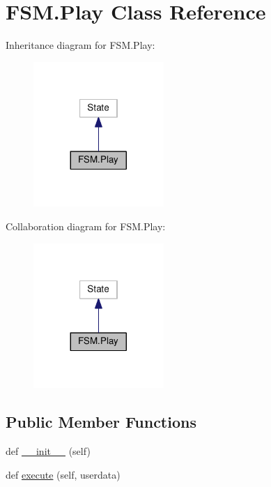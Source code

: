 \hypertarget{classFSM_1_1Play}{}\section{F\+S\+M.\+Play Class Reference}
\label{classFSM_1_1Play}


Inheritance diagram for F\+S\+M.\+Play\+:\nopagebreak
\begin{figure}[H]
\begin{center}
\leavevmode
\includegraphics[width=140pt]{classFSM_1_1Play__inherit__graph}
\end{center}
\end{figure}


Collaboration diagram for F\+S\+M.\+Play\+:\nopagebreak
\begin{figure}[H]
\begin{center}
\leavevmode
\includegraphics[width=140pt]{classFSM_1_1Play__coll__graph}
\end{center}
\end{figure}
\subsection*{Public Member Functions}
\begin{DoxyCompactItemize}
\item 
def \hyperlink{classFSM_1_1Play_adbcc8a351d8013f0fd40e778bc85b5e0}{\+\_\+\+\_\+init\+\_\+\+\_\+} (self)
\item 
def \hyperlink{classFSM_1_1Play_ab7c062e30152b05f18bccd330d618634}{execute} (self, userdata)
\end{DoxyCompactItemize}
